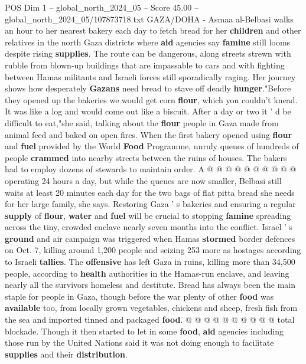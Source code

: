 \begin{textsample}{POS Dim 1 – global\_north\_2024\_05 – Score 45.00 – global\_north\_2024\_05/107873718.txt}  \label{ex:f1_pos_274}
GAZA/DOHA - Asmaa al-Belbasi walks an hour to her nearest bakery each day to fetch bread for her \textbf{children} and other relatives in the north Gaza districts where \textbf{aid} agencies say \textbf{famine} still looms despite rising \textbf{supplies}.
The route can be dangerous, along streets strewn with rubble from blown-up buildings that are impassable to cars and with fighting between Hamas militants and Israeli forces still sporadically raging.
Her journey shows how desperately \textbf{Gazans} need bread to stave off deadly \textbf{hunger}."Before they opened up the bakeries we would get corn \textbf{flour}, which you couldn't knead.
It was like a log and would come out like a biscuit.
After a day or two it ' d be difficult to eat,"she said, talking about the \textbf{flour} people in Gaza made from animal feed and baked on open fires.
When the first bakery opened using \textbf{flour} and \textbf{fuel} provided by the World \textbf{Food} Programme, unruly queues of hundreds of people \textbf{crammed} into nearby streets between the ruins of houses.
The bakers had to employ dozens of stewards to maintain order.
A @ @ @ @ @ @ @ @ @ @ operating 24 hours a day, but while the queues are now smaller, Belbasi still waits at least 20 minutes each day for the two bags of flat pitta bread she needs for her large family, she says.
Restoring Gaza ' s bakeries and ensuring a regular \textbf{supply} of \textbf{flour}, \textbf{water} and \textbf{fuel} will be crucial to stopping \textbf{famine} spreading across the tiny, crowded enclave nearly seven months into the conflict.
Israel ' s \textbf{ground} and air campaign was triggered when Hamas \textbf{stormed} border defences on Oct. 7, killing around 1,200 people and seizing 253 more as hostages according to Israeli \textbf{tallies}.
The \textbf{offensive} has left Gaza in ruins, killing more than 34,500 people, according to \textbf{health} authorities in the Hamas-run enclave, and leaving nearly all the survivors homeless and destitute.
Bread has always been the main staple for people in Gaza, though before the war plenty of other \textbf{food} was \textbf{available} too, from locally grown vegetables, chickens and sheep, fresh fish from the sea and imported tinned and packaged \textbf{food}. @ @ @ @ @ @ @ @ @ @ total blockade.
Though it then started to let in some \textbf{food}, \textbf{aid} agencies including those run by the United Nations said it was not doing enough to facilitate \textbf{supplies} and their \textbf{distribution}.

\end{textsample}
